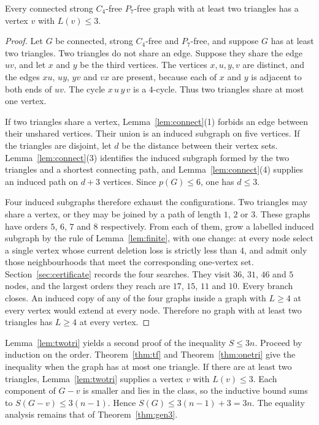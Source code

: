 \documentclass[ASNA]{USG}
\theoremstyle{WBstyletwo}
\numberwithin{equation}{section}
\newcommand{\pp}{p}
\begin{document}
\begin{lemma}\label{lem:twotri}
Every connected strong $C_4$-free $P_7$-free graph with at least two triangles has a vertex $v$ with $L(v)\le 3$.
\end{lemma}

\begin{proof}
Let $G$ be connected, strong $C_4$-free and $P_7$-free, and suppose $G$ has at least two triangles. Two triangles do not share an edge. Suppose they share the edge $uv$, and let $x$ and $y$ be the third vertices. The vertices $x,u,y,v$ are distinct, and the edges $xu$, $uy$, $yv$ and $vx$ are present, because each of $x$ and $y$ is adjacent to both ends of $uv$. The cycle $x\,u\,y\,v$ is a $4$-cycle. Thus two triangles share at most one vertex.

If two triangles share a vertex, Lemma~\ref{lem:connect}(1) forbids an edge between their unshared vertices. Their union is an induced subgraph on five vertices. If the triangles are disjoint, let $d$ be the distance between their vertex sets. Lemma~\ref{lem:connect}(3) identifies the induced subgraph formed by the two triangles and a shortest connecting path, and Lemma~\ref{lem:connect}(4) supplies an induced path on $d+3$ vertices. Since $\pp(G)\le 6$, one has $d\le 3$.

Four induced subgraphs therefore exhaust the configurations. Two triangles may share a vertex, or they may be joined by a path of length $1$, $2$ or $3$. These graphs have orders $5$, $6$, $7$ and $8$ respectively. From each of them, grow a labelled induced subgraph by the rule of Lemma~\ref{lem:finite}, with one change: at every node select a single vertex whose current deletion loss is strictly less than $4$, and admit only those neighbourhoods that meet the corresponding one-vertex set. Section~\ref{sec:certificate} records the four searches. They visit $36$, $31$, $46$ and $5$ nodes, and the largest orders they reach are $17$, $15$, $11$ and $10$. Every branch closes. An induced copy of any of the four graphs inside a graph with $L\ge 4$ at every vertex would extend at every node. Therefore no graph with at least two triangles has $L\ge 4$ at every vertex.
\end{proof}

\begin{remark}\label{rem:twotri}
Lemma~\ref{lem:twotri} yields a second proof of the inequality $S\le 3n$. Proceed by induction on the order. Theorem~\ref{thm:tf} and Theorem~\ref{thm:onetri} give the inequality when the graph has at most one triangle. If there are at least two triangles, Lemma~\ref{lem:twotri} supplies a vertex $v$ with $L(v)\le 3$. Each component of $G-v$ is smaller and lies in the class, so the inductive bound sums to $S(G-v)\le 3(n-1)$. Hence $S(G)\le 3(n-1)+3=3n$. The equality analysis remains that of Theorem~\ref{thm:gen3}.
\end{remark}
\end{document}
